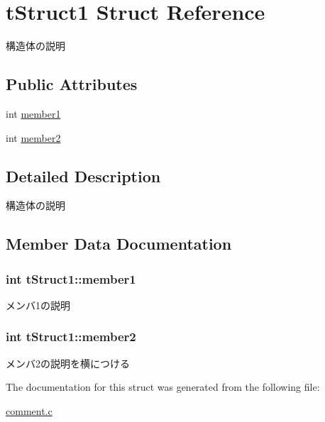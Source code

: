 \hypertarget{structtStruct1}{\section{t\+Struct1 Struct Reference}
\label{structtStruct1}
}


構造体の説明  


\subsection*{Public Attributes}
\begin{DoxyCompactItemize}
\item 
int \hyperlink{structtStruct1_a0b88ed76b5666ff4c53bd9b970b21a94}{member1}
\item 
int \hyperlink{structtStruct1_a37a05db08291456653d5567d981c8d86}{member2}
\end{DoxyCompactItemize}


\subsection{Detailed Description}
構造体の説明 

\subsection{Member Data Documentation}
\hypertarget{structtStruct1_a0b88ed76b5666ff4c53bd9b970b21a94}{
\subsubsection[{member1}]{\setlength{\rightskip}{0pt plus 5cm}int t\+Struct1\+::member1}}\label{structtStruct1_a0b88ed76b5666ff4c53bd9b970b21a94}
メンバ1の説明 \hypertarget{structtStruct1_a37a05db08291456653d5567d981c8d86}{
\subsubsection[{member2}]{\setlength{\rightskip}{0pt plus 5cm}int t\+Struct1\+::member2}}\label{structtStruct1_a37a05db08291456653d5567d981c8d86}
メンバ2の説明を横につける 

The documentation for this struct was generated from the following file\+:\begin{DoxyCompactItemize}
\item 
\hyperlink{comment_8c}{comment.\+c}\end{DoxyCompactItemize}
